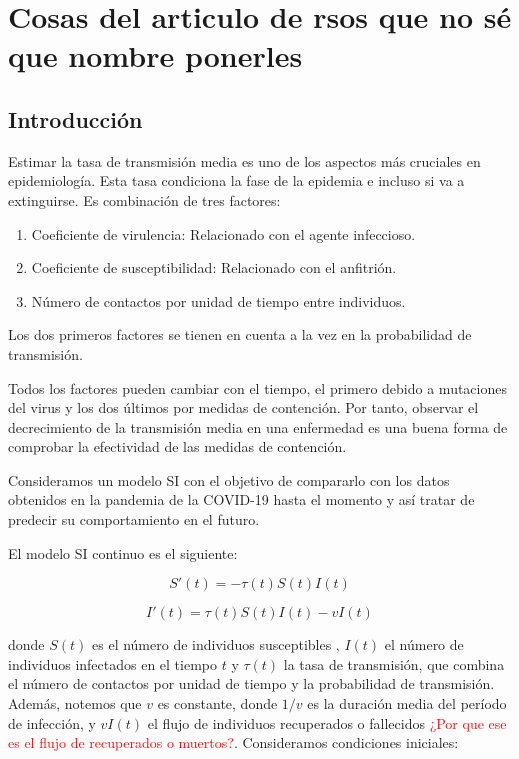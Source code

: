 \section{Cosas del articulo de rsos que no sé que nombre ponerles}

\subsection{Introducción}

Estimar la tasa de transmisión media es uno de los aspectos más cruciales en epidemiología. Esta tasa condiciona la fase de la epidemia e incluso si va a extinguirse. Es combinación de tres factores:

\begin{enumerate}
\item Coeficiente de virulencia: Relacionado con el agente infeccioso.
\item Coeficiente de susceptibilidad: Relacionado con el anfitrión.
\item Número de contactos por unidad de tiempo entre individuos.
\end{enumerate}

Los dos primeros factores se tienen en cuenta a la vez en la probabilidad de transmisión.

Todos los factores pueden cambiar con el tiempo, el primero debido a mutaciones del virus y los dos últimos por medidas de contención. Por tanto, observar el decrecimiento de la transmisión media en una enfermedad es una buena forma de comprobar la efectividad de las medidas de contención.

Consideramos un modelo SI con el objetivo de compararlo con los datos obtenidos en la pandemia de la COVID-19 hasta el momento y así tratar de predecir su comportamiento en el futuro.

El modelo SI continuo es el siguiente:

\begin{equation}
\label{eqn: SI_S_cont}
S'(t) = -\tau (t)S(t)I(t)
\end{equation}

\begin{equation}
\label{eqn: SI_I_cont}
I'(t) = \tau (t)S(t)I(t) -vI(t)
\end{equation}

donde $S(t)$ es el número de individuos susceptibles , $I(t)$ el número de individuos infectados en el tiempo $t$ y $\tau (t)$ la tasa de transmisión, que combina el número de contactos por unidad de tiempo y la probabilidad de transmisión. Además, notemos que $v$ es constante, donde $1/v$ es la duración media del período de infección, y $vI(t)$ el flujo de individuos recuperados o fallecidos \textcolor{red}{¿Por que ese es el flujo de recuperados o muertos?}. Consideramos condiciones iniciales:

